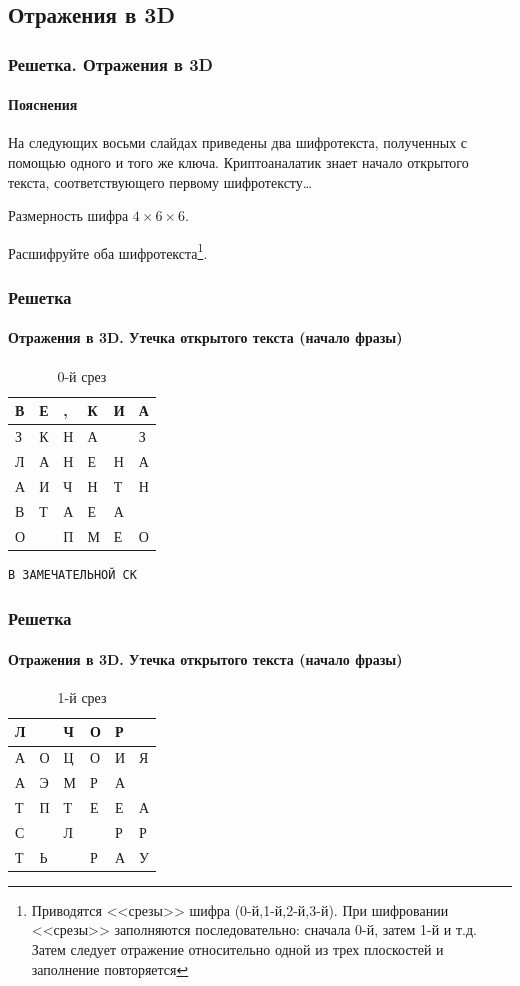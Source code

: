 \subsection{Отражения в 3D}

\begin{frame}[fragile]
    \frametitle{Решетка. Отражения в 3D}
    \framesubtitle{Пояснения}
        
    На следующих восьми слайдах приведены два шифротекста, полученных с помощью одного и того же ключа. Криптоаналатик знает начало открытого текста, соответствующего первому шифротексту\ldots
    
    Размерность шифра $4\times 6\times 6$.
    
    Расшифруйте оба шифротекста\footnote{Приводятся <<срезы>> шифра (0-й,1-й,2-й,3-й). При шифровании <<срезы>> заполняются последовательно: сначала 0-й, затем 1-й и т.д. Затем следует отражение относительно одной из трех плоскостей и заполнение повторяется}.
\end{frame}


\begin{frame}[fragile]
    \frametitle{Решетка}
    \framesubtitle{Отражения в 3D. Утечка открытого текста (начало фразы)}
    
    \begin{table}[ht]
        \caption{0-й срез}
        \centering
        \begin{tabular}[c]{|l|l|l|l|l|l|}
            \hline
            В&Е&,&К&И&А\\ \hline
            З&К&Н&А& &З\\ \hline
            Л&А&Н&Е&Н&А\\ \hline
            А&И&Ч&Н&Т&Н\\ \hline
            В&Т&А&Е&А& \\ \hline
            О& &П&М&Е&О\\ \hline
        \end{tabular}
    \end{table}
\begin{verbatim}
В ЗАМЕЧАТЕЛЬНОЙ СК
\end{verbatim}
\end{frame}


\begin{frame}[fragile]
    \frametitle{Решетка}
    \framesubtitle{Отражения в 3D. Утечка открытого текста (начало фразы)}
    
    \begin{table}[ht]
        \caption{1-й срез}
        \centering
        \begin{tabular}[c]{|l|l|l|l|l|l|}
            \hline
            Л& &Ч&О&Р& \\ \hline
            А&О&Ц&О&И&Я\\ \hline
            А&Э&М&Р&А& \\ \hline
            Т&П&Т&Е&Е&А\\ \hline
            С& &Л& &Р&Р\\ \hline
            Т&Ь& &Р&А&У\\ \hline
        \end{tabular}
    \end{table}
\end{frame}


